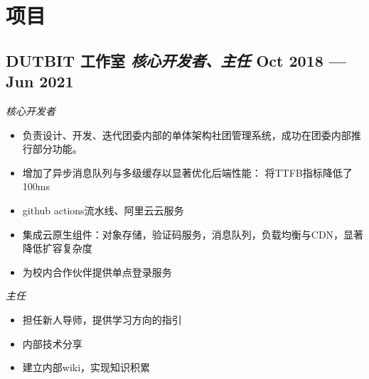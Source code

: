 \documentclass[a4,12pt]{article}
\newcommand{\subtext}[1]{
#1\par\vspace{-0.3cm}}
\newenvironment{zitemize}{
\begin{itemize}\itemsep0pt \parskip0pt \parsep1pt}
{\end{itemize}\vspace{-0.5cm}}
\begin{document}


\section{\textbf{项目}} %



\subsection*{DUTBIT 工作室 {\normalsize\normalfont \textit{核心开发者、主任}} \hfill  Oct 2018 --- Jun 2021} 
\subtext{\textit{核心开发者}}
    \begin{zitemize}
        \item 负责设计、开发、迭代团委内部的单体架构社团管理系统，成功在团委内部推行部分功能。
        \item 增加了异步消息队列与多级缓存以显著优化后端性能： 将TTFB指标降低了100ms
        \item github actions流水线、阿里云云服务
        \item 集成云原生组件：对象存储，验证码服务，消息队列，负载均衡与CDN，显著降低扩容复杂度
        \item 为校内合作伙伴提供单点登录服务 
    \end{zitemize}
\vspace{0.3cm}
\subtext{\textit{主任}}
\begin{zitemize}
    \item 担任新人导师，提供学习方向的指引
    \item 内部技术分享
    \item 建立内部wiki，实现知识积累
\end{zitemize}
\end{document}
